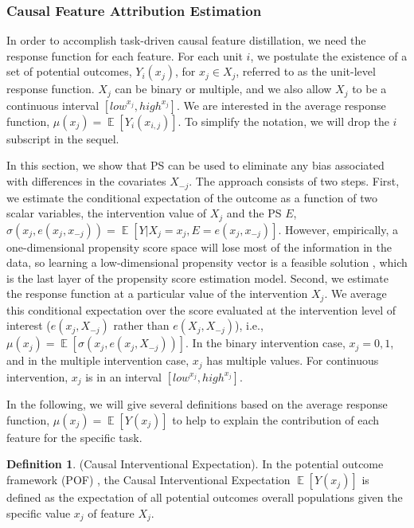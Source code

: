 \documentclass[letterpaper]{article} %
\DeclareMathOperator{\E}{\mathbb{E}}
\theoremstyle{definition}
\newtheorem{definition}{Definition}
\theoremstyle{remark}
\begin{document}
\subsubsection{Causal Feature Attribution Estimation}

In order to accomplish task-driven causal feature distillation, we need the response function for each feature. For each unit $i$, we postulate the existence of a set of potential outcomes, $Y_i(x_j)$, for $x_j \in X_j$, referred to as the unit-level response function. $X_j$ can be binary or multiple, and we also allow $X_j$ to be a continuous interval $[{low}^{x_j}, {high}^{x_j}]$. We are interested in the average response function, $\mu(x_j) = \E[Y_i(x_{i,j})]$. To simplify the notation, we will drop the $i$ subscript in the sequel.

In this section, we show that PS can be used to eliminate any bias associated with differences in the covariates $X_{-j}$. The approach consists of two steps. First, we estimate the conditional expectation of the outcome as a function of two scalar variables, the intervention value of $X_j$ and the PS $E$, $\sigma(x_j, e(x_{j}, x_{-j})) = \E[Y|X_j = x_j, E = e(x_{j}, x_{-j})]$. However, empirically, a one-dimensional propensity score space will lose most of the information in the data, so learning a low-dimensional propensity vector is a feasible solution \cite{chu2020matching}, which is the last layer of the propensity score estimation model. Second, we estimate the response function at a particular value of the intervention $X_j$. We average this conditional expectation over the score evaluated at the intervention level of interest ($e(x_j, X_{-j})$ rather than $e(X_j, X_{-j})$), i.e., $\mu(x_j) = \E[\sigma(x_j, e(x_{j}, X_{-j}))]$. In the binary intervention case, $x_j ={0, 1}$, and in the multiple intervention case, $x_j$ has multiple values. For continuous intervention, $x_j$ is in an interval $[low^{x_j}, high^{x_j}]$.

In the following, we will give several definitions based on the average response function, $\mu(x_j) = \E[Y(x_j)]$ to help to explain the contribution of each feature for the specific task.


\theoremstyle{definition}
\begin{definition}({Causal Interventional Expectation}).
In the potential outcome framework (POF) \cite{rosenbaum1983central}, the Causal Interventional Expectation $\E[Y(x_j)]$ is defined as the expectation of all potential outcomes overall populations given the specific value $x_j$ of feature $X_j$.
\label{def: causal importance}
\end{definition}
\end{document}
